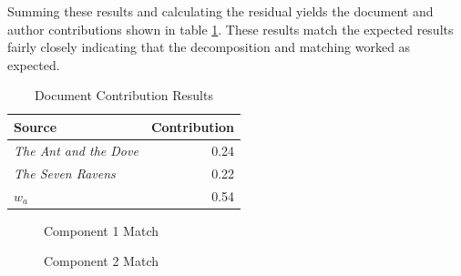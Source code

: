 \documentclass{article}
\begin{document}
Summing these results and calculating the residual yields the document
and author contributions shown in table \ref{tab:docresults}.  These
results match the expected results fairly closely indicating that the
decomposition and matching worked as expected.

\begin{table}
    \label{tab:docresults}
    \begin{tabular}{l|r}
        {\bf Source} & {\bf Contribution} \\
        \hline
        {\em The Ant and the Dove} & 0.24 \\
        {\em The Seven Ravens} & 0.22 \\
        $w_a$ & 0.54
    \end{tabular}
    \caption{Document Contribution Results}
\end{table}

\begin{figure}%
    \centering
    \qquad
    \caption{Component 1 Match}%
    \label{fig:com1}%
\end{figure}

\begin{figure}%
    \centering
    \qquad
    \caption{Component 2 Match}%
    \label{fig:com2}%
\end{figure}
\end{document}

